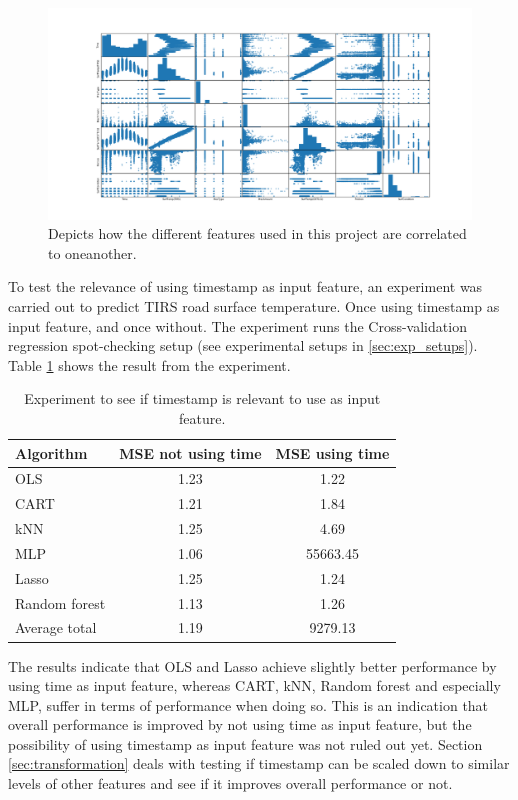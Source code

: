 \begin{figure}[H] 
	\centering
	\includegraphics[width=1\textwidth]{media/correlations_ver2.png}
	\caption{Depicts how the different features used in this project are correlated to oneanother.}
	\label{img:correlations_noerr}
\end{figure}

	To test the relevance of using timestamp as input feature, an experiment was carried out to predict TIRS road surface temperature. Once using timestamp as input feature, and once without. The experiment runs the Cross-validation regression spot-checking setup (see experimental setups in \ref{sec:exp_setups}). Table \ref{table:timeinput} shows the result from the experiment.

	\begin{table}[H] %
	\centering
	\caption{Experiment to see if timestamp is relevant to use as input feature. }
		\begin{tabular}[3]{l | c | c}
    			Algorithm & MSE not using time & MSE using time \\
    			\hline
			OLS & 1.23 & 1.22 \\
			CART & 1.21 & 1.84 \\
			kNN & 1.25 & 4.69 \\
			MLP & 1.06 & 55663.45 \\
			Lasso & 1.25 & 1.24 \\
			Random forest & 1.13 & 1.26 \\
			\hline
			Average total & 1.19 & 9279.13
			\label{table:timeinput}
		\end{tabular}
	\end{table}

	The results indicate that OLS and Lasso achieve slightly better performance by using time as input feature, whereas CART, kNN, Random forest and especially MLP, suffer in terms of performance when doing so. This is an indication that overall performance is improved by not using time as input feature, but the possibility of using timestamp as input feature was not ruled out yet. Section \ref{sec:transformation} deals with testing if timestamp can be scaled down to similar levels of other features and see if it improves overall performance or not.

